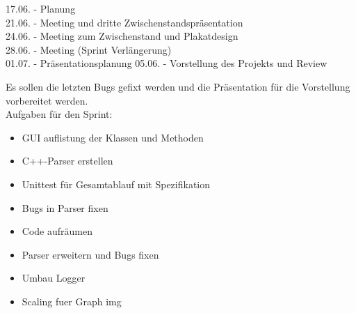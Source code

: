 
17.06. - Planung \\
21.06. - Meeting und dritte Zwischenstandspräsentation \\
24.06. - Meeting zum Zwischenstand und Plakatdesign \\
28.06. - Meeting (Sprint Verlängerung) \\
01.07. - Präsentationsplanung
05.06. - Vorstellung des Projekts und Review \\

\nsecend%


Es sollen die letzten Bugs gefixt werden und die Präsentation für die Vorstellung vorbereitet werden.
\\
Aufgaben für den Sprint:
\begin{itemize}
	\item GUI auflistung der Klassen und Methoden
	\item C++-Parser erstellen
	\item Unittest für Gesamtablauf mit Spezifikation
	\item Bugs in Parser fixen
	\item Code aufräumen
	\item Parser erweitern und Bugs fixen
	\item Umbau Logger
	\item Scaling fuer Graph img
	
\end{itemize}

\nsecend


